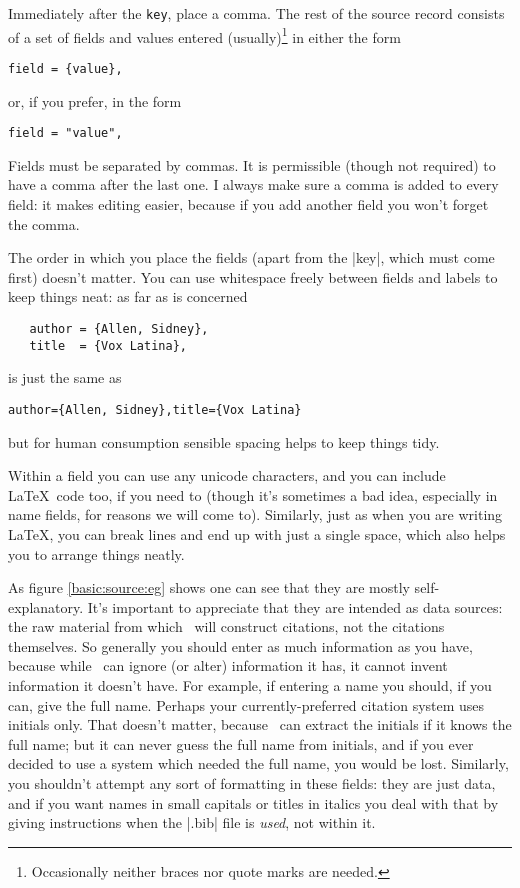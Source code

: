 Immediately after the \verb|key|, place a comma. The rest of the
source record consists of a set of fields and values entered
(usually)\footnote{Occasionally neither braces nor quote marks are
    needed.} in either the form
\begin{center}\texttt{field = \{value\},}\end{center}
or, if you prefer, in the form
\begin{center}\texttt{field = "value",}\end{center}
Fields must be separated by commas. It is permissible (though not
required) to have a comma after the last one. I always make sure a
comma is added to every field: it makes editing easier, because if you
add another field you won't forget the comma.

The order in which you place the fields (apart from the |key|, which
must come first) doesn't matter. You can use whitespace freely between
fields and labels to keep things neat: as far as  is
concerned
\begin{Verbatim}
   author = {Allen, Sidney},
   title  = {Vox Latina},
\end{Verbatim}
is just the same as
\begin{Verbatim}
author={Allen, Sidney},title={Vox Latina}
\end{Verbatim}
but for human consumption sensible spacing helps to keep things tidy.

Within a field you can use any unicode characters, and you can include
\LaTeX\ code too, if you need to (though it's sometimes a bad idea,
especially in name fields, for reasons we will come to). Similarly,
just as when you are writing \LaTeX, you can break lines and end up
with just a single space, which also helps you to arrange things
neatly.

As figure \ref{basic:source:eg} shows one
can see that they are mostly self-explanatory. It's important to
appreciate that they are intended as data sources: the raw material
from which \biblatex\ will construct citations, not the citations
themselves. So generally you should enter as much information as you
have, because while \biblatex\ can ignore (or alter) information it
has, it cannot invent information it doesn't have. For example, if
entering a name you should, if you can, give the full name. Perhaps
your currently-preferred citation system uses initials only. That
doesn't matter, because \biblatex\ can extract the initials if it
knows the full name; but it can never guess the full name from
initials, and if you ever decided to use a system which needed the
full name, you would be lost. Similarly, you shouldn't attempt any
sort of formatting in these fields: they are just data, and if you
want names in small capitals or titles in italics you deal with that
by giving instructions when the |.bib| file is \emph{used}, not within
it.

